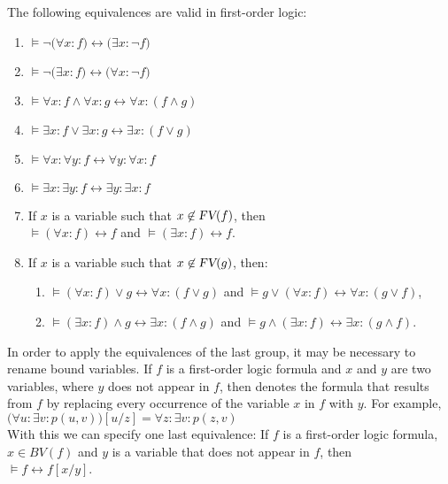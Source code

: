 \begin{Satz}
  The following equivalences are valid in first-order logic:
  \begin{enumerate}
  \item $\models \neg\big(\forall x\colon f\big) \leftrightarrow \big(\exists x\colon \neg f\big)$
  \item $\models \neg\big(\exists x\colon f\big) \leftrightarrow \big(\forall x\colon \neg f\big)$
  \item $\models \forall x\colon f \wedge \forall x\colon g \leftrightarrow \forall x\colon (f \wedge g)$
  \item $\models \exists x\colon f \vee \exists x\colon g \leftrightarrow \exists x\colon (f \vee g)$
  \item $\models \forall x\colon \forall y\colon f \leftrightarrow \forall y\colon  \forall x\colon f$
  \item $\models \exists x\colon \exists y\colon f \leftrightarrow \exists y\colon  \exists x\colon f$
  \item If $x$ is a variable such that $x \not\in \textsl{FV}(f)$, then \\[0.2cm]
        \hspace*{1.3cm} $\models  (\forall x\colon f) \leftrightarrow f$ \quad and \quad
                        $\models  (\exists x\colon f) \leftrightarrow f$.
  \item If $x$ is a variable such that $x \not\in \textsl{FV}(g)$, then:
    \begin{enumerate}
    \item $\models (\forall x\colon f) \vee g \leftrightarrow \forall x\colon (f \vee g)$ \quad and \quad $\models g \vee (\forall x\colon f) \leftrightarrow \forall x\colon (g \vee f)$,
    \item $\models (\exists x\colon f) \wedge g \leftrightarrow \exists x\colon (f \wedge g)$ \quad and \quad $\models g \wedge (\exists x\colon f) \leftrightarrow \exists x\colon (g \wedge f)$.
    \end{enumerate}
  \end{enumerate}
\end{Satz}

In order to apply the equivalences of the last group, it may be necessary to rename bound variables. If $f$ is a first-order logic formula and $x$ and $y$ are two variables, where $y$ does not appear in $f$, then  denotes the formula that results from $f$ by replacing every occurrence of the variable $x$ in $f$ with $y$. For example, \\[0.2cm]
\hspace*{1.3cm} $\bigl(\forall u : \exists v : p(u,v)\bigr)[u/z] = \forall z : \exists v : p(z,v)$
\\[0.2cm]
With this we can specify one last equivalence: If $f$ is a first-order logic formula, $x \in BV(f)$ and $y$ is a variable that does not appear in $f$, then \\[0.2cm]
\hspace*{1.3cm} $\models f \leftrightarrow f[x/y]$.
\vspace{0.3cm}

